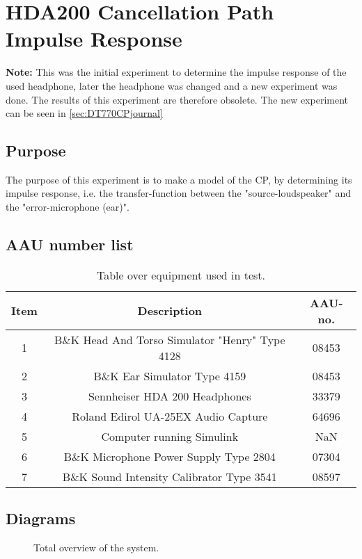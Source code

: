 \section{HDA200 Cancellation Path Impulse Response} \label{sec:CPjournal}
\textbf{Note:} This was the initial experiment to determine the impulse response of the used headphone, later the headphone was changed and a new experiment was done. The results of this experiment are therefore obsolete. The new experiment can be seen in \autoref{sec:DT770CPjournal}

\subsection{Purpose}
The purpose of this experiment is to make a model of the CP, by determining its impulse response, i.e. the transfer-function between the "source-loudspeaker" and the "error-microphone (ear)".
		
\subsection{AAU number list}
\begin{table}[h]
	\centering
	\begin{tabular}{ c c c } \toprule
		{Item}	& {Description} 						& {AAU-no}. \\ \bottomrule 
		1	&	B\&K Head And Torso Simulator "Henry" Type 4128	& 08453		\\
		2	&	B\&K Ear Simulator Type 4159			& 08453		\\
		3	&	Sennheiser HDA 200	Headphones			& 33379		\\
		4	&	Roland Edirol UA-25EX Audio Capture		& 64696		\\
		5	&	Computer running Simulink\textsuperscript{\textregistered}					& NaN		\\
		6	&	B\&K Microphone Power Supply Type 2804 	& 07304		\\
		7	&	B\&K Sound Intensity Calibrator Type 3541	& 08597	\\ \bottomrule
	\end{tabular}
	\caption{Table over equipment used in test.}
	\label{tab:UsedEquipmentListningCP}
\end{table}

\subsection{Diagrams}
\begin{figure}[H]
	\centering
	
	\caption{Total overview of the system.}
	\label{SchematicOverviewCP}
\end{figure}

